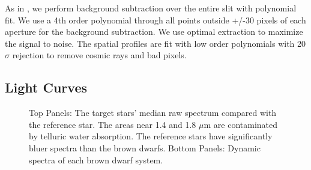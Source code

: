 \documentclass[twocolumn]{aastex6}
\begin{document}
As in \citet{schlawin2016kic1255}, we perform background subtraction over the entire slit with polynomial fit.
We use a 4th order polynomial through all points outside +/-30 pixels of each aperture for the background subtraction.
We use optimal extraction \citep{horne1986optimalE} to maximize the signal to noise.
The spatial profiles are fit with low order polynomials with 20$\sigma$ rejection to remove cosmic rays and bad pixels.

\subsection{Light Curves}

\begin{figure}[!t]
\centering
{}
	\caption{Top Panels: The target stars' median raw spectrum compared with the reference star. The areas near 1.4 and 1.8 $\mu$m are contaminated by telluric water absorption. The reference stars have significantly bluer spectra than the brown dwarfs. Bottom Panels: Dynamic spectra of each brown dwarf system.}
	\label{fig:specphot}
	\vspace{0.1in}
\end{figure} 
\end{document}
